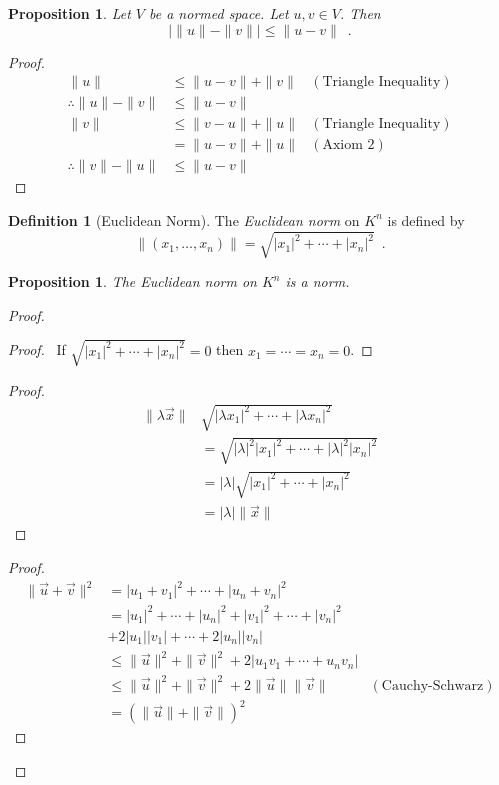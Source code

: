 \documentclass{book}
\let\qed\relax
\newtheorem{prop}[ax]{Proposition}
\theoremstyle{definition}
\newtheorem{df}[ax]{Definition}
\begin{document}
\begin{prop}
\label{prop:diffnorms}
Let $V$ be a normed space. Let $u,v \in V$. Then
\[ |\|u\| - \|v\|| \leq \|u-v\| \enspace . \]
\end{prop}

\begin{proof}
\pf
\begin{align*}
\|u\| & \leq \|u-v\| + \|v\| & (\text{Triangle Inequality}) \\
\therefore \|u\| - \|v\| & \leq \|u-v\| \\
\|v\| & \leq \|v-u\| + \|u\| & (\text{Triangle Inequality}) \\
& = \|u-v\| + \|u\| & (\text{Axiom 2})\\
\therefore \|v\| - \|u\| & \leq \|u-v\|
\end{align*}
\end{proof}

\begin{df}[Euclidean Norm]
The \emph{Euclidean norm} on $K^n$ is defined by
\[ \| (x_1, \ldots, x_n) \| = \sqrt{|x_1|^2 + \cdots + |x_n|^2} \enspace . \]
\end{df}

\begin{prop}
The Euclidean norm on $K^n$ is a norm.
\end{prop}

\begin{proof}
\pf
{}
\begin{proof}
	\pf\ If $\sqrt{|x_1|^2 + \cdots + |x_n|^2} = 0$ then $x_1 = \cdots = x_n = 0$.
\end{proof}
\begin{proof}
	\pf
	\begin{align*}
		\| \lambda \vec{x} \| & \sqrt{|\lambda x_1|^2 + \cdots + |\lambda x_n|^2} \\
		& = \sqrt{|\lambda|^2 |x_1|^2 + \cdots + |\lambda|^2 |x_n|^2} \\
		& = |\lambda| \sqrt{|x_1|^2 + \cdots + |x_n|^2} \\
		& = |\lambda| \|\vec{x}\|
	\end{align*}
\end{proof}
\begin{proof}
	\pf
	\begin{align*}
		\|\vec{u} + \vec{v}\|^2 & = |u_1 + v_1|^2 + \cdots + |u_n + v_n|^2 \\
		& = |u_1|^2 + \cdots + |u_n|^2 + |v_1|^2 + \cdots + |v_n|^2 \\
		& +
		2|u_1||v_1| + \cdots + 2|u_n||v_n| \\
		& \leq \|\vec{u}\|^2 + \|\vec{v}\|^2 + 2 |u_1 v_1 + \cdots + u_n v_n| \\
		& \leq \|\vec{u}\|^2 + \|\vec{v}\|^2 + 2 \| \vec{u} \| \| \vec{v} \| & (\text{Cauchy-Schwarz}) \\
		& = (\| \vec{u}\| + \|\vec{v}\|)^2
	\end{align*}
\end{proof}
\qed
\end{proof}
\end{document}
